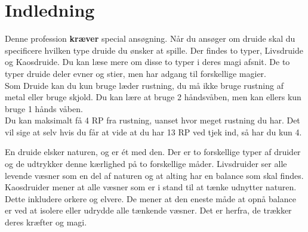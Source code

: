 \chapter{Indledning}

Denne profession \textbf{kræver} special ansøgning. Når du ansøger om druide skal du specificere hvilken type druide du ønsker at spille. Der findes to typer, Livsdruide og Kaosdruide. Du kan læse mere om disse to typer i deres magi afsnit.
De to typer druide deler evner og stier, men har adgang til forskellige magier.\\

Som Druide kan du kun bruge læder rustning, du må ikke bruge rustning af metal eller bruge skjold. Du kan lære at bruge 2 håndsvåben, men kan ellers kun bruge 1 hånds våben.\\
Du kan maksimalt få 4 RP fra rustning, uanset hvor meget rustning du har. Det vil sige at selv hvis du får at vide at du har 13 RP ved tjek ind, så har du kun 4.

En druide elsker naturen, og er ét med den. Der er to forskellige typer af druider og de udtrykker denne kærlighed på to forskellige måder. Livsdruider ser alle levende væsner som en del af naturen og at alting har en balance som skal findes. Kaosdruider mener at alle væsner som er i stand til at tænke udnytter naturen. Dette inkludere orkere og elvere. De mener at den eneste måde at opnå balance er ved at isolere eller udrydde alle tænkende væsner. Det er herfra, de trækker deres kræfter og magi. 